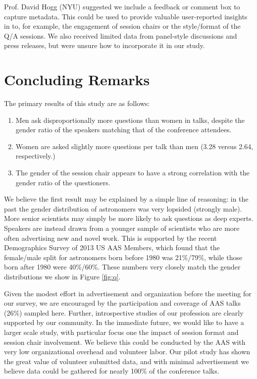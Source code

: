 \documentclass[iop]{emulateapj}
\begin{document}
Prof. David Hogg (NYU) suggested we include a feedback or comment box to capture metadata. This could be used to provide valuable user-reported insights in to, for example, the engagement of session chairs or the style/format of the Q/A sessions. 
We also received limited data from panel-style discussions and press releases, but were unsure how to incorporate it in our study. 






\section{Concluding Remarks}

The primary results of this study are as follows:
\begin{enumerate}
\item Men ask disproportionally more questions than women in talks, despite the gender ratio of the speakers matching that of the conference attendees.
\item Women are asked slightly more questions per talk than men (3.28 versus 2.64, respectively.)
\item The gender of the session chair appears to have a strong correlation with the gender ratio of the questioners.
\end{enumerate}

We believe the first result may be explained by a simple line of reasoning: in the past the gender distribution of astronomers was very lopsided (strongly male). More senior scientists may simply be more likely to ask questions as deep experts. Speakers are instead drawn from a younger sample of scientists who are more often advertising new and novel work. This is supported by the recent Demographics Survey of 2013 US AAS Members, which found that the female/male split for astronomers born before 1980 was 21\%/79\%, while those born after 1980 were 40\%/60\%. These numbers very closely match the gender distributions we show in Figure \ref{fig:q}.

Given the modest effort in advertisement and organization before the meeting for our survey, we are encouraged by the participation and coverage of AAS talks (26\%) sampled here. Further, introspective studies of our profession are clearly supported by our community. In the immediate future, we would like to have a larger scale study, with particular focus one the impact of session format and session chair involvement. We believe this could be conducted by the AAS with very low organizational overhead and volunteer labor. Our pilot study has shown the great value of volunteer submitted data, and with minimal advertisement we believe data could be gathered for nearly 100\% of the conference talks.
\end{document}
